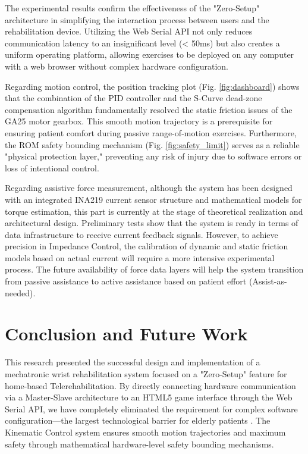 \documentclass[conference]{IEEEtran}
\begin{document}
The experimental results confirm the effectiveness of the "Zero-Setup" architecture in simplifying the interaction process between users and the rehabilitation device. Utilizing the Web Serial API not only reduces communication latency to an insignificant level (< 50ms) but also creates a uniform operating platform, allowing exercises to be deployed on any computer with a web browser without complex hardware configuration.

Regarding motion control, the position tracking plot (Fig. \ref{fig:dashboard}) shows that the combination of the PID controller and the S-Curve dead-zone compensation algorithm fundamentally resolved the static friction issues of the GA25 motor gearbox. This smooth motion trajectory is a prerequisite for ensuring patient comfort during passive range-of-motion exercises. Furthermore, the ROM safety bounding mechanism (Fig. \ref{fig:safety_limit}) serves as a reliable "physical protection layer," preventing any risk of injury due to software errors or loss of intentional control.

Regarding assistive force measurement, although the system has been designed with an integrated INA219 current sensor structure and mathematical models for torque estimation, this part is currently at the stage of theoretical realization and architectural design. Preliminary tests show that the system is ready in terms of data infrastructure to receive current feedback signals. However, to achieve precision in Impedance Control, the calibration of dynamic and static friction models based on actual current will require a more intensive experimental process. The future availability of force data layers will help the system transition from passive assistance to active assistance based on patient effort (Assist-as-needed).

\section{Conclusion and Future Work}

This research presented the successful design and implementation of a mechatronic wrist rehabilitation system focused on a "Zero-Setup" feature for home-based Telerehabilitation. By directly connecting hardware communication via a Master-Slave architecture to an HTML5 game interface through the Web Serial API, we have completely eliminated the requirement for complex software configuration—the largest technological barrier for elderly patients \cite{nikafrooz2017design}. The Kinematic Control system ensures smooth motion trajectories and maximum safety through mathematical hardware-level safety bounding mechanisms.
\end{document}
